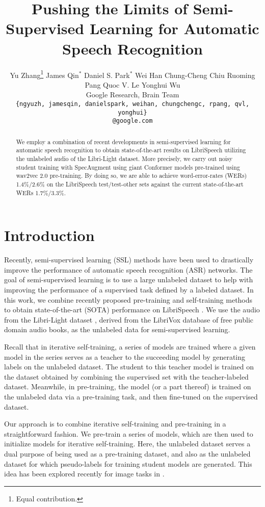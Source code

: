 \documentclass[dvipsnames]{article}
\title{Pushing the Limits of Semi-Supervised Learning for Automatic Speech Recognition}
\author{Yu Zhang\thanks{Equal contribution.} \And
  James Qin$^*$ \And
  Daniel S. Park$^*$ \And
  Wei Han \And
  Chung-Cheng Chiu \And
  Ruoming Pang \And
  Quoc V. Le \And
  Yonghui Wu \AND
\\
  Google Research, Brain Team \\[7pt]
  \texttt{\{ngyuzh, jamesqin, danielspark, weihan, chungchengc, rpang, qvl, yonghui\}} \\
  \texttt{@google.com}
}
\begin{document}
\maketitle

\begin{abstract}
We employ a combination of recent developments in semi-supervised learning for automatic speech recognition to obtain state-of-the-art results on LibriSpeech utilizing the unlabeled audio of the Libri-Light dataset. More precisely, we carry out noisy student training with SpecAugment using giant Conformer models pre-trained using wav2vec 2.0 pre-training. By doing so, we are able to achieve word-error-rates (WERs) 1.4\%/2.6\% on the LibriSpeech test/test-other sets against the current state-of-the-art WERs 1.7\%/3.3\%.
\end{abstract}

\section{Introduction}

Recently, semi-supervised learning (SSL) methods have been used to drastically improve the performance of automatic speech recognition (ASR) networks. The goal of semi-supervised learning is to use a large unlabeled dataset to help with improving the performance of a supervised task defined by a labeled dataset. In this work, we combine recently proposed pre-training and self-training methods to obtain state-of-the-art (SOTA) performance on LibriSpeech \cite{librispeech}. We use the audio from the Libri-Light dataset \cite{librilight}, derived from the LibriVox database of free public domain audio books, as the unlabeled data for semi-supervised learning.

Recall that in iterative self-training, a series of models are trained where a given model in the series serves as a teacher to the succeeding model by generating labels on the unlabeled dataset. The student to this teacher model is trained on the dataset obtained by combining the supervised set with the teacher-labeled dataset. Meanwhile, in pre-training, the model (or a part thereof) is trained on the unlabeled data via a pre-training task, and then fine-tuned on the supervised dataset. 

Our approach is to combine iterative self-training and pre-training in a straightforward fashion. We pre-train a series of models, which are then used to initialize models for iterative self-training. Here, the unlabeled dataset serves a dual purpose of being used as a pre-training dataset, and also as the unlabeled dataset for which pseudo-labels for training student models are generated. This idea has been explored recently for image tasks in \cite{simclrv2, zoph2020rethinking}.
\end{document}
